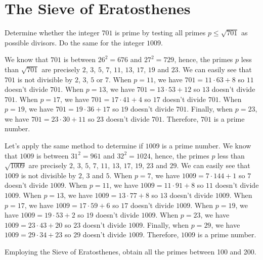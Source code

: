 \section{The Sieve of Eratosthenes}

\begin{exercise}
    Determine whether the integer $701$ is prime by testing all primes $p \leq \sqrt{701}$ as possible divisors. Do the same for the integer $1009$. \\
\end{exercise}

\begin{solution}
    We know that $701$ is between $26^2 = 676$ and $27^2 = 729$, hence, the primes $p$ less than $\sqrt{701}$ are precisely $2$, $3$, $5$, $7$, $11$, $13$, $17$, $19$ and $23$. We can easily see that $701$ is not divisible by $2$, $3$, $5$ or $7$. When $p = 11$, we have $701 = 11 \cdot 63 + 8$ so $11$ doesn't divide $701$. When $p = 13$, we have $701 = 13 \cdot 53 + 12$ so $13$ doesn't divide $701$. When $p = 17$, we have $701 = 17 \cdot 41 + 4$ so $17$ doesn't divide $701$. When $p = 19$, we have $701 = 19 \cdot 36 + 17$ so $19$ doesn't divide $701$. Finally, when $p = 23$, we have $701 = 23 \cdot 30 + 11$ so $23$ doesn't divide $701$. Therefore, $701$ is a prime number.

    Let's apply the same method to determine if $1009$ is a prime number. We know that $1009$ is between $31^2 = 961$ and $32^2 = 1024$, hence, the primes $p$ less than $\sqrt{1009}$ are precisely $2$, $3$, $5$, $7$, $11$, $13$, $17$, $19$, $23$ and $29$. We can easily see that $1009$ is not divisible by $2$, $3$ and $5$. When $p = 7$, we have $1009 = 7 \cdot 144 + 1$ so $7$ doesn't divide $1009$. When $p = 11$, we have $1009 = 11 \cdot 91 + 8$ so $11$ doesn't divide $1009$. When $p = 13$, we have $1009 = 13 \cdot 77 + 8$ so $13$ doesn't divide $1009$. When $p = 17$, we have $1009 = 17 \cdot 59 + 6$ so $17$ doesn't divide $1009$. When $p = 19$, we have $1009 = 19 \cdot 53 + 2$ so $19$ doesn't divide $1009$. When $p = 23$, we have $1009 = 23 \cdot 43 + 20$ so $23$ doesn't divide $1009$. Finally, when $p = 29$, we have $1009 = 29 \cdot 34 + 23$ so $29$ doesn't divide $1009$. Therefore, $1009$ is a prime number. \\
\end{solution}

\begin{exercise}
    Employing the Sieve of Eratosthenes, obtain all the primes between 100 and 200. \\
\end{exercise}

